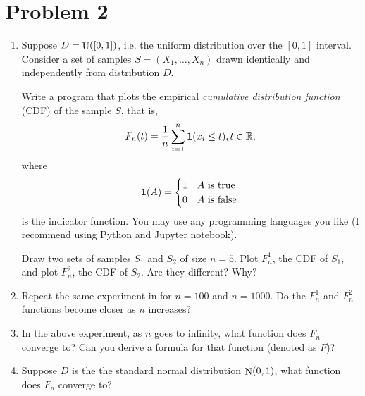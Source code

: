\documentclass{article}
\DeclareMathOperator*{\U}{{\rm U}}
\DeclareMathOperator*{\N}{{\rm N}}
\newcommand{\RR}{\mathbb{R}} %
\newcommand*{\one}{{\bf 1}}
\begin{document}
\section*{Problem 2}
\begin{enumerate}
\item Suppose $D = \U([0,1])$, i.e. the uniform distribution over the
$[0,1]$ interval.
Consider a set of samples $S = (X_1, \ldots, X_n)$
drawn identically and independently from distribution $D$.

Write a program that plots the empirical {\em cumulative distribution
function} (CDF) of the sample $S$, that is,
\[ F_n(t) = \frac{1}{n} \sum_{i=1}^n \one(x_i \leq t), t \in \RR, \]
where
\[ \one(A) = \begin{cases} 1 & A \text{ is true } \\ 0 & A \text{ is false } \end{cases} \]
is the indicator function. You may use any programming languages you like (I recommend using Python and Jupyter
notebook).

Draw two sets of samples $S_1$ and $S_2$ of size $n = 5$. Plot $F_n^1$,
the CDF of $S_1$, and plot $F_n^2$, the CDF of $S_2$. Are they different? Why?

\label{item:2-a}

\item Repeat the same experiment in \label{item:2-a} for $n = 100$ and $n=1000$. Do
the $F_n^1$ and $F_n^2$ functions become closer as $n$ increases?
\label{item:2-b}

\item In the above experiment, as $n$ goes to infinity, what function does $F_n$ converge to?
Can you derive a formula for that function (denoted as $F$)?
\label{item:2-c}

\item Suppose $D$ is the the
standard normal distribution $\N(0,1)$, what function does $F_n$ converge to?
\end{enumerate}
\end{document}
